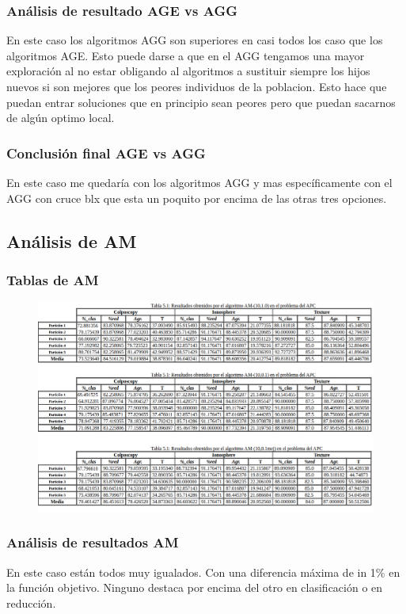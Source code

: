 \documentclass[titlepage]{article}
\begin{document}
	\subsubsection{Análisis de resultado AGE vs AGG}
	En este caso los algoritmos AGG son superiores en casi todos los caso que los algoritmos AGE. Esto puede darse a que en el AGG tengamos una mayor exploración al no estar obligando al algoritmos a sustituir siempre los hijos  nuevos si son mejores que los peores individuos de la poblacion. Esto hace que puedan entrar soluciones que en principio sean peores pero que puedan sacarnos de algún optimo local. 

	\subsubsection{Conclusión final AGE vs AGG}
	En este caso me quedaría con los algoritmos AGG y mas específicamente con el AGG	con cruce blx que esta un poquito por encima de las otras tres opciones.
	
	
	\subsection{Análisis de AM}
	\subsubsection{Tablas de AM}
	\begin{figure}[H]
		\centering
		\includegraphics[width=1\linewidth]{screenshot009}
		\caption{}
		\label{fig:screenshot009}
	\end{figure}
	\subsubsection{Análisis de resultados AM}
	En este caso están todos muy igualados. Con una diferencia máxima de in 1\% en la función objetivo. Ninguno destaca por encima del otro en clasificación o en reducción. 
	
\end{document}
